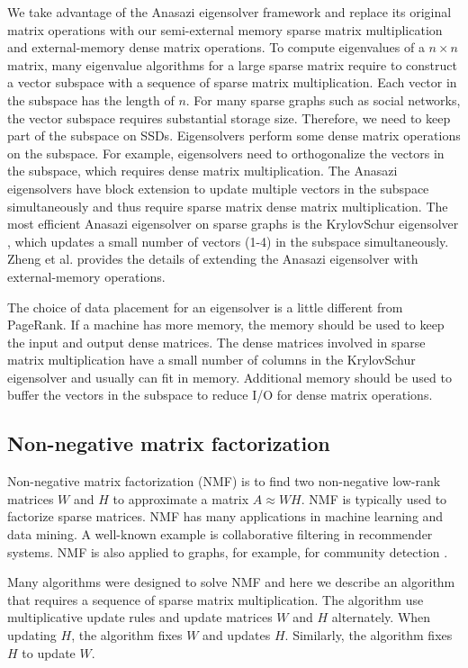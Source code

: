 We take advantage of the Anasazi eigensolver framework \cite{anasazi} and
replace its original matrix operations with our semi-external memory sparse
matrix multiplication and external-memory dense matrix operations. To compute
eigenvalues of a $n \times n$ matrix, many eigenvalue algorithms for a large
sparse matrix require to construct a vector subspace with a sequence of
sparse matrix multiplication. Each vector in the subspace has the length of $n$.
For many sparse graphs such as social networks, the vector subspace requires
substantial storage size. Therefore, we need to keep part of the subspace
on SSDs. Eigensolvers perform some dense matrix operations on the subspace.
For example, eigensolvers need to orthogonalize the vectors in the subspace,
which requires dense matrix multiplication. The Anasazi eigensolvers have
block extension to update multiple
vectors in the subspace simultaneously and thus require sparse matrix dense
matrix multiplication. The most efficient Anasazi eigensolver on sparse graphs
is the KrylovSchur eigensolver \cite{krylovschur}, which updates a small number
of vectors (1-4) in the subspace simultaneously. Zheng et al.
\cite{flasheigen} provides the details of extending the Anasazi eigensolver
with external-memory operations.

The choice of data placement for an eigensolver is a little different from
PageRank. If a machine has more memory, the memory should be used to keep
		the input and output dense matrices. The dense matrices involved in
		sparse matrix multiplication have a small number of columns in
		the KrylovSchur eigensolver and usually can fit in memory. 
Additional memory should be used to buffer the vectors in the subspace
		to reduce I/O for dense matrix operations.

\subsection{Non-negative matrix factorization}
Non-negative matrix factorization (NMF) \cite{nmf} is to find two non-negative
low-rank matrices $W$ and $H$ to approximate a matrix $A \approx WH$. NMF is
typically used to factorize sparse matrices. NMF has many applications in
machine learning
and data mining. A well-known example is collaborative filtering \cite{cf} in
recommender systems. NMF is also applied to graphs, for example, for community
detection \cite{yang13, wang11}.

Many algorithms were designed to solve NMF and here we describe an algorithm
\cite{nmf} that requires a sequence of sparse matrix multiplication.
The algorithm use multiplicative update rules and update matrices $W$ and $H$
alternately. When updating $H$, the algorithm fixes $W$ and updates $H$.
Similarly, the algorithm fixes $H$ to update $W$.

